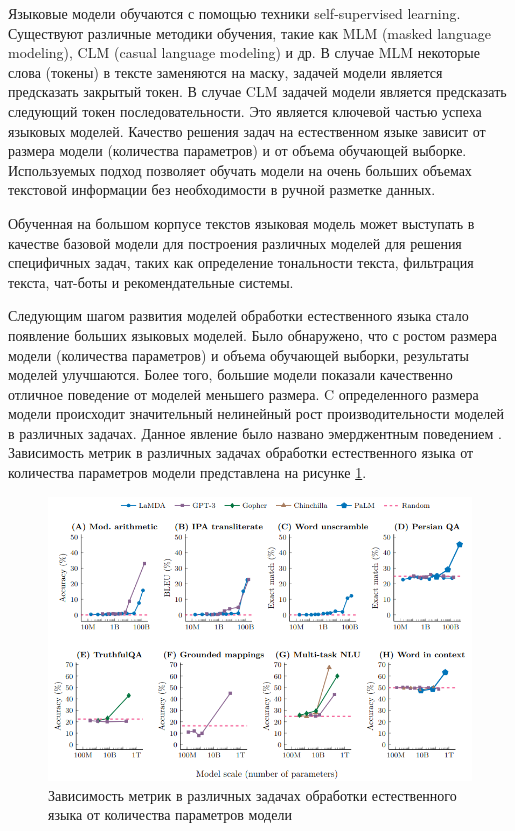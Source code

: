 Языковые модели обучаются с помощью техники self-supervised learning. Существуют различные методики обучения, такие как MLM (masked language modeling), CLM (casual language modeling) и др. В случае MLM некоторые слова (токены) в тексте заменяются на маску, задачей модели является предсказать закрытый токен. В случае CLM задачей модели является предсказать следующий токен последовательности. Это является ключевой частью успеха языковых моделей. Качество решения задач на естественном языке зависит от размера модели (количества параметров) и от объема обучающей выборке. Используемых подход позволяет обучать модели на очень больших объемах текстовой информации без необходимости в ручной разметке данных.

Обученная на большом корпусе текстов языковая модель может выступать в качестве базовой модели для построения различных моделей для решения специфичных задач, таких как определение тональности текста, фильтрация текста, чат-боты и рекомендательные системы.

Следующим шагом развития моделей обработки естественного языка стало появление больших языковых моделей. Было обнаружено, что с ростом размера модели (количества параметров) и объема обучающей выборки, результаты моделей улучшаются. Более того, большие модели показали качественно отличное поведение от моделей меньшего размера. C определенного размера модели происходит значительный нелинейный рост производительности моделей в различных задачах. Данное явление было названо эмерджентным поведением \cite{llm_emergent}. Зависимость метрик в различных задачах обработки естественного языка от количества параметров модели представлена на рисунке \ref{img:llm_scaling}.

\begin{figure}[h]
    \centering
    \includegraphics[width=\linewidth]{../images/llm_scaling.png}
    \caption{Зависимость метрик в различных задачах обработки естественного языка от количества параметров модели \cite{llm_emergent}}
    \label{img:llm_scaling}
\end{figure}

